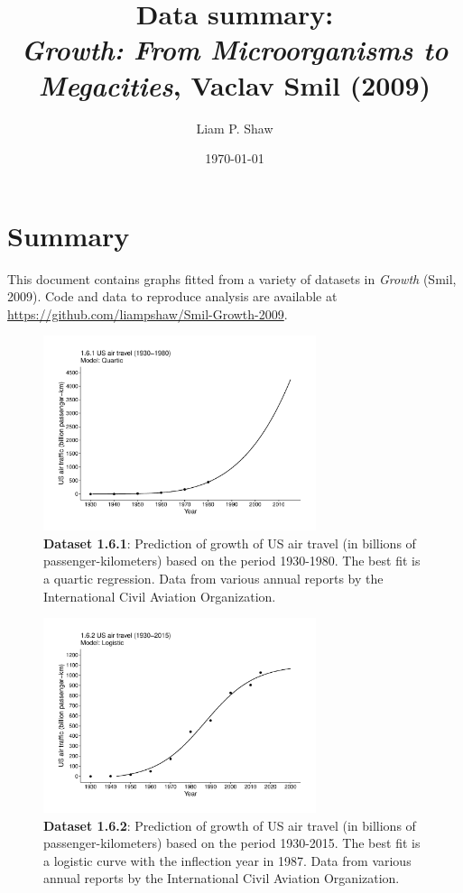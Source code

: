\documentclass[aps,rmp,preprint,superscriptaddress,10pt,onecolumn]{article}
\begin{document}
\title{Data summary:\\\textit{Growth: From Microorganisms to Megacities}, Vaclav Smil (2009)}
\author{Liam P. Shaw}
\date{\today}


\maketitle

\section*{Summary}

\noindent This document contains graphs fitted from a variety of datasets in \textit{Growth} (Smil, 2009). Code and data to reproduce analysis are available at \url{https://github.com/liampshaw/Smil-Growth-2009}. 
\begin{figure}[h]
\includegraphics[width=8cm]{output/figs-ggplot/1.6.1.pdf}
\caption{\textbf{Dataset 1.6.1}: Prediction of growth of US air travel (in billions of passenger-kilometers) based on the period 1930-1980. The best fit is a quartic regression. Data from various annual reports by the International Civil Aviation Organization. }
\end{figure}
	
\begin{figure}[h]
\includegraphics[width=8cm]{output/figs-ggplot/1.6.2.pdf}
\caption{\textbf{Dataset 1.6.2}: Prediction of growth of US air travel (in billions of passenger-kilometers) based on the period 1930-2015. The best fit is a logistic curve with the inflection year in 1987. Data from various annual reports by the International Civil Aviation Organization. }
\end{figure}
	
\end{document}
